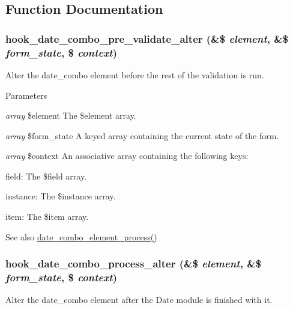 \subsection{Function Documentation}
\hypertarget{date_8api_8php_acb65970e9f533601f60f43e490e85356}{
\subsubsection[{hook\_\-date\_\-combo\_\-pre\_\-validate\_\-alter}]{\setlength{\rightskip}{0pt plus 5cm}hook\_\-date\_\-combo\_\-pre\_\-validate\_\-alter (\&\$ {\em element}, \/  \&\$ {\em form\_\-state}, \/  \$ {\em context})}}
\label{date_8api_8php_acb65970e9f533601f60f43e490e85356}
Alter the date\_\-combo element before the rest of the validation is run.


\begin{DoxyParams}{Parameters}
\item[{\em array}]\$element The \$element array. \item[{\em array}]\$form\_\-state A keyed array containing the current state of the form. \item[{\em array}]\$context An associative array containing the following keys:
\begin{DoxyItemize}
\item field: The \$field array.
\item instance: The \$instance array.
\item item: The \$item array.
\end{DoxyItemize}\end{DoxyParams}
\begin{DoxySeeAlso}{See also}
\hyperlink{date__elements_8inc_a9542273df9fca1ba0a55c26573f3744e}{date\_\-combo\_\-element\_\-process()} 
\end{DoxySeeAlso}
\hypertarget{date_8api_8php_abbae4e6ce7b9d70996e06174fc11497c}{
\subsubsection[{hook\_\-date\_\-combo\_\-process\_\-alter}]{\setlength{\rightskip}{0pt plus 5cm}hook\_\-date\_\-combo\_\-process\_\-alter (\&\$ {\em element}, \/  \&\$ {\em form\_\-state}, \/  \$ {\em context})}}
\label{date_8api_8php_abbae4e6ce7b9d70996e06174fc11497c}
Alter the date\_\-combo element after the Date module is finished with it.


